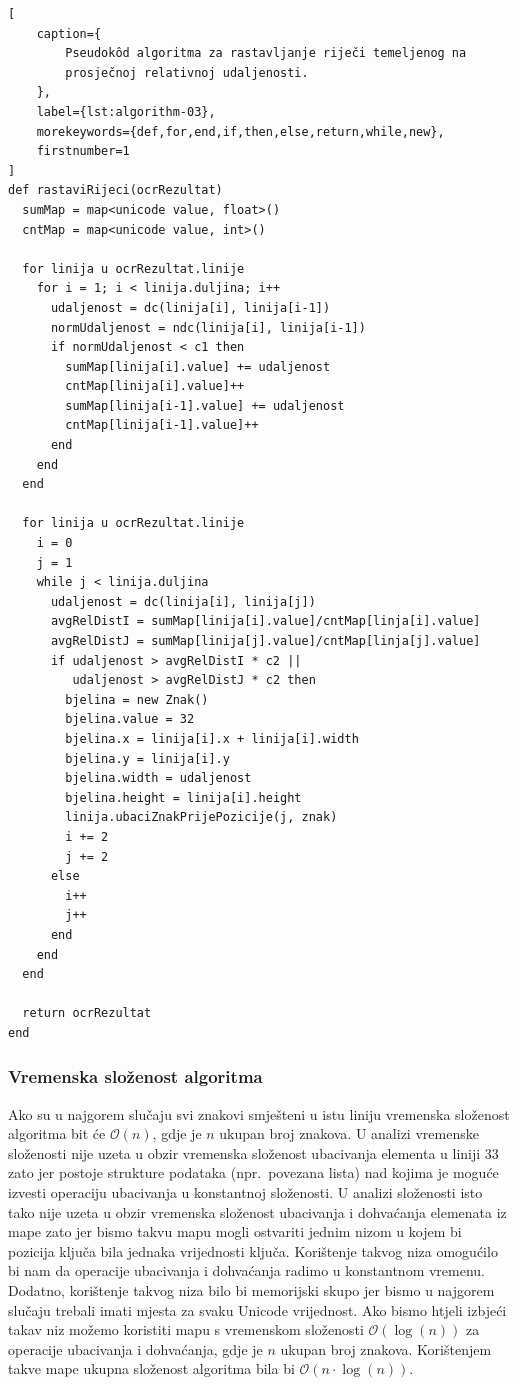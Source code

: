 \documentclass[times, utf8, zavrsni]{fer}
\begin{document}
\begin{lstlisting}[
    caption={
        Pseudokôd algoritma za rastavljanje riječi temeljenog na
        prosječnoj relativnoj udaljenosti.
    },
    label={lst:algorithm-03},
    morekeywords={def,for,end,if,then,else,return,while,new},
    firstnumber=1
]
def rastaviRijeci(ocrRezultat)
  sumMap = map<unicode value, float>()
  cntMap = map<unicode value, int>()

  for linija u ocrRezultat.linije
    for i = 1; i < linija.duljina; i++
      udaljenost = dc(linija[i], linija[i-1])
      normUdaljenost = ndc(linija[i], linija[i-1])
      if normUdaljenost < c1 then
        sumMap[linija[i].value] += udaljenost
        cntMap[linija[i].value]++
        sumMap[linija[i-1].value] += udaljenost
        cntMap[linija[i-1].value]++
      end
    end
  end

  for linija u ocrRezultat.linije
    i = 0
    j = 1
    while j < linija.duljina
      udaljenost = dc(linija[i], linija[j])
      avgRelDistI = sumMap[linija[i].value]/cntMap[linja[i].value]
      avgRelDistJ = sumMap[linija[j].value]/cntMap[linja[j].value]
      if udaljenost > avgRelDistI * c2 ||
         udaljenost > avgRelDistJ * c2 then
        bjelina = new Znak()
        bjelina.value = 32
        bjelina.x = linija[i].x + linija[i].width
        bjelina.y = linija[i].y
        bjelina.width = udaljenost
        bjelina.height = linija[i].height
        linija.ubaciZnakPrijePozicije(j, znak)
        i += 2
        j += 2
      else
        i++
        j++
      end
    end
  end

  return ocrRezultat
end
\end{lstlisting}


\subsubsection{Vremenska složenost algoritma}
Ako su u najgorem slučaju svi znakovi smješteni u istu liniju vremenska
složenost algoritma bit će $\mathcal{O}(n)$, gdje je $n$ ukupan broj
znakova. U analizi vremenske složenosti nije uzeta u obzir vremenska složenost
ubacivanja elementa u liniji $33$ zato jer postoje strukture podataka
(npr.\ povezana lista) nad kojima je moguće izvesti operaciju ubacivanja u
konstantnoj složenosti. U analizi složenosti isto tako nije uzeta u obzir
vremenska složenost ubacivanja i dohvaćanja elemenata iz mape zato jer bismo
takvu mapu mogli ostvariti jednim nizom u kojem bi pozicija ključa bila jednaka
vrijednosti ključa. Korištenje takvog niza omogućilo bi nam da operacije
ubacivanja i dohvaćanja radimo u konstantnom vremenu. Dodatno, korištenje
takvog niza bilo bi memorijski skupo jer bismo u najgorem slučaju trebali imati
mjesta za svaku Unicode vrijednost. Ako bismo htjeli izbjeći takav niz možemo
koristiti mapu s vremenskom složenosti $\mathcal{O}(\log(n))$ za operacije
ubacivanja i dohvaćanja, gdje je $n$ ukupan broj znakova. Korištenjem takve
mape ukupna složenost algoritma bila bi $\mathcal{O}(n \cdot \log(n))$.
\end{document}
